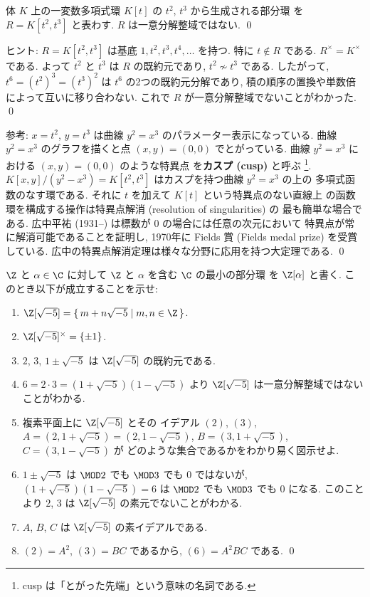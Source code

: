 \documentclass[12pt,twoside]{jarticle}
\begin{document}

\begin{question}
\label{q:R[t^2,t^3]-not-UFD}
  体 $K$ 上の一変数多項式環 $K[t]$ の $t^2$, $t^3$ から生成される部分環
  を $R=K[t^2,t^3]$ と表わす.  $R$ は一意分解整域ではない.
  \qed
\end{question}

\noindent
ヒント: $R=K[t^2,t^3]$ は基底 $1,t^2,t^3,t^4,\ldots$ を持つ. 
特に $t\not\in R$ である. $R^\times=K^\times$ である.
よって $t^2$ と $t^3$ は $R$ の既約元であり, $t^2\not\sim t^3$ である.
したがって, $t^6=(t^2)^3=(t^3)^2$ は $t^6$ の2つの既約元分解であり,
積の順序の置換や単数倍によって互いに移り合わない.
これで $R$ が一意分解整域でないことがわかった.
\qed

\medskip
\noindent
参考: $x=t^2$, $y=t^3$ は曲線 $y^2=x^3$ のパラメーター表示になっている.
曲線 $y^2=x^3$ のグラフを描くと点 $(x,y)=(0,0)$ でとがっている.
曲線 $y^2=x^3$ における $(x,y)=(0,0)$ のような特異点
を{\bf カスプ (cusp)} と呼ぶ%
\footnote{cusp は「とがった先端」という意味の名詞である.}.
$K[x,y]/(y^2-x^3)=K[t^2,t^3]$ はカスプを持つ曲線 $y^2=x^3$ の上の
多項式函数のなす環である.  
それに $t$ を加えて $K[t]$ という特異点のない直線上
の函数環を構成する操作は特異点解消 (resolution of singularities) の
最も簡単な場合である.
広中平祐 (1931--) は標数が $0$ の場合には任意の次元において
特異点が常に解消可能であることを証明し, 
1970年に Fields 賞 (Fields medal prize) を受賞している.
広中の特異点解消定理は様々な分野に応用を持つ大定理である.
\qed


\begin{question}
\label{q:Z[sqrt(-5)]-not-UFD}
  $\Z$ と $\alpha\in\C$ に対して $\Z$ と $\alpha$ を含む $\C$ の最小の部分環
  を $\Z[\alpha]$ と書く.  このとき以下が成立することを示せ:
  \begin{enumerate}
  \item $\Z[\sqrt{-5}] = \{\, m+n\sqrt{-5} \mid m,n\in\Z \,\}$.
  \item $\Z[\sqrt{-5}]^\times = \{\pm1\}$.
  \item $2$, $3$, $1\pm\sqrt{-5}$ は $\Z[\sqrt{-5}]$ の既約元である.
  \item $6=2\cdot 3=(1+\sqrt{-5})(1-\sqrt{-5})$ 
    より $\Z[\sqrt{-5}]$ は一意分解整域ではないことがわかる.
  \item 複素平面上に $\Z[\sqrt{-5}]$ とその
    イデアル $(2)$, $(3)$, $A=(2,1+\sqrt{-5})=(2,1-\sqrt{-5})$, 
    $B=(3,1+\sqrt{-5})$, $C=(3,1-\sqrt{-5})$ が
    どのような集合であるかをわかり易く図示せよ. 
  \item $1\pm\sqrt{-5}$ は $\MOD 2$ でも $\MOD 3$ でも $0$ ではないが,
    $(1+\sqrt{-5})(1-\sqrt{-5})=6$ は $\MOD 2$ でも $\MOD 3$ でも $0$ になる.
    このことより $2$, $3$ は $\Z[\sqrt{-5}]$ の素元でないことがわかる.
  \item $A$, $B$, $C$ は $\Z[\sqrt{-5}]$ の素イデアルである.
  \item $(2)=A^2$, $(3)=BC$ であるから, $(6)=A^2BC$ である.
    \qed
  \end{enumerate}
\end{question}
\end{document}
